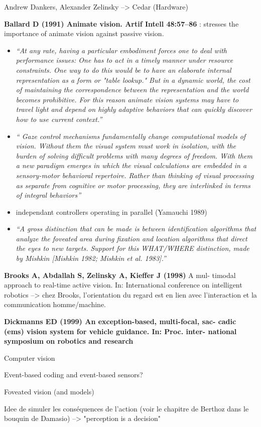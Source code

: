 \documentclass[12pt,twoside,openright]{article}
\begin{document}
    {\color{magenta} Andrew Dankers, Alexander Zelinsky --> Cedar (Hardware)
    
    {\bf Ballard D (1991) Animate vision. Artif Intell 48:57–86} : stresses the importance of animate vision against passive vision. 
    \begin{itemize}
    	\item \emph{``At any rate, having a particular embodiment forces
    	one to deal with performance issues: One has to act in a timely manner under resource constraints.
    	One way to do this would be to have an elaborate internal representation as a form or "table lookup." But in a dynamic world, the cost of maintaining the correspondence between the representation and the world becomes prohibitive. For this reason animate vision systems may have to travel light and depend on highly adaptive behaviors that can quickly discover how to use current context.''}
        \item \emph{`` Gaze control mechanisms fundamentally change computational models of vision. Without
        	them the visual system must work in isolation, with the burden of solving difficult problems with
        	many degrees of freedom. With them a new paradigm emerges in which the visual calculations are
        	embedded in a sensory-motor behavioral repertoire. Rather than thinking of visual
        	processing as separate from cognitive or motor processing, they are interlinked
        	in terms of integral behaviors''}
    	\item independant controllers operating in parallel	(Yamauchi 1989)
    	\item \emph{``A gross distinction that
    	can be made is between identification algorithms that analyze the foveated area during fixation and
    	location algorithms that direct the eyes to new targets. Support for this WHAT/WHERE distinction, made by Mishkin [Mishkin 1982; Mishkin et al. 1983].''}
    \end{itemize}
    
    {\bf Brooks A, Abdallah S, Zelinsky A, Kieffer J (1998)} A mul-
    timodal approach to real-time active vision. In: International
    conference on intelligent robotics --> chez Brooks, l'orientation du regard est en lien avec l'interaction et la communication homme/machine.
    
    {\bf Dickmanns ED (1999) An exception-based, multi-focal, sac-
    cadic (ems) vision system for vehicle guidance. In: Proc. inter-
    national symposium on robotics and research}
    
    Computer vision
    
	Event-based coding and event-based  sensors?
	
	Foveated vision (and models)
	
	Idee de simuler les conséquences de l'action (voir le chapitre de Berthoz dans le bouquin de Damasio) --> "perception is a decision"}
\end{document}
